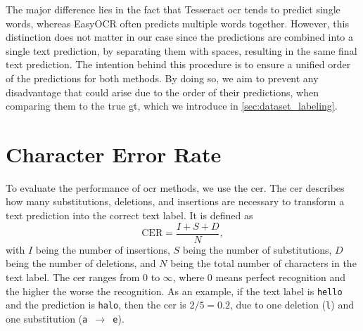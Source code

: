 The major difference lies in the fact that Tesseract \gls{ocr} tends to predict single words, whereas EasyOCR often predicts multiple words together.
However, this distinction does not matter in our case since the predictions are combined into a single text prediction, by separating them with spaces, resulting in the same final text prediction.
The intention behind this procedure is to ensure a unified order of the predictions for both methods.
By doing so, we aim to prevent any disadvantage that could arise due to the order of their predictions, when comparing them to the true \gls{gt}, which we introduce in \autoref{sec:dataset_labeling}.


\section{Character Error Rate}
\label{subsec:cer}

To evaluate the performance of \gls{ocr} methods, we use the \gls{cer}.
The \gls{cer} \cite{cer_2022} describes how many substitutions, deletions, and insertions are necessary to transform a text prediction into the correct text label.
It is defined as
\begin{equation}
    \text{CER} = \frac{I + S + D}{N},
    \label{eq:cer}
\end{equation}
with $I$ being the number of insertions, $S$ being the number of substitutions, $D$ being the number of deletions, and $N$ being the total number of characters in the text label.
The \gls{cer} ranges from 0 to $\infty$, where 0 means perfect recognition and the higher the worse the recognition.
As an example, if the text label is \texttt{hello} and the prediction is \texttt{halo}, then the \gls{cer} is $2/5 = 0.2$, due to one deletion (\texttt{l}) and one substitution (\texttt{a $\rightarrow$ e}).

